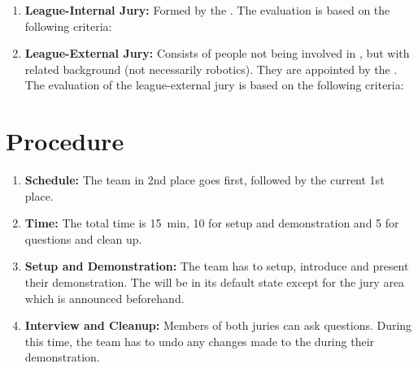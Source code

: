 \begin{enumerate}
\item\textbf{League-Internal Jury:} Formed by the \EC{}. The evaluation is based on the following criteria:

\item \textbf{League-External Jury:} Consists of people not being involved in \RoboCup\AtHome{}, but with related background (not necessarily robotics). They are appointed by the . The evaluation of the league-external jury is based on the following criteria:
\end{enumerate}


\section{Procedure}
\label{sec:finals:procedure}
\begin{enumerate}%
	\item \textbf{Schedule:} The team in 2nd place goes first, followed by the current 1st place.
	\item \textbf{Time:} The total time is \SI{15}{\minute}, 10 for setup and demonstration and 5 for questions and clean up.
	\item \textbf{Setup and Demonstration:} The team has to setup, introduce and present their demonstration. The \Arena{} will be in its default state except for the jury area which is announced beforehand.
	\item \textbf{Interview and Cleanup:} Members of both juries can ask questions. During this time, the team has to undo any changes made to the \Arena{} during their demonstration.
\end{enumerate}%


